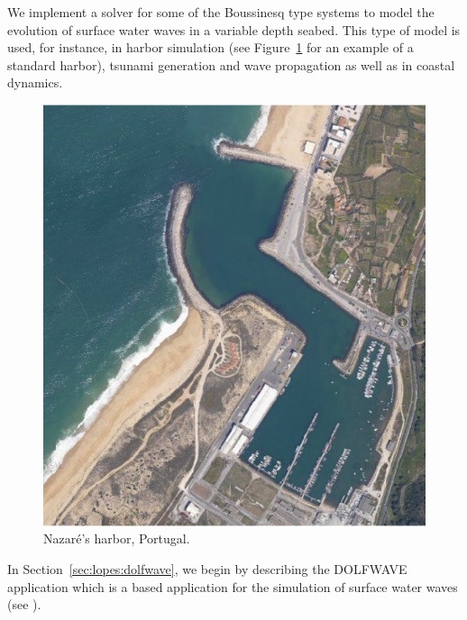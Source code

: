 We implement a solver  for some of the Boussinesq type
systems to model the evolution of surface water
waves in a variable depth seabed.  This
type of model is used, for instance, in harbor
simulation (see Figure~\ref{fig:lopes:harbor} for an
example of a standard harbor), tsunami generation and wave
propagation as well as in coastal dynamics.
\begin{figure}
  \begin{center}
    \includegraphics[width=\smallfig]{chapters/lopes/pdf/nazare1.pdf}
  \end{center}
  \caption{Nazar\'{e}'s harbor, Portugal.}\label{fig:lopes:harbor}
\end{figure}

In Section~\ref{sec:lopes:dolfwave}, we begin by describing the
DOLFWAVE application which is a \fenics based application for the
simulation of surface water waves (see ).

